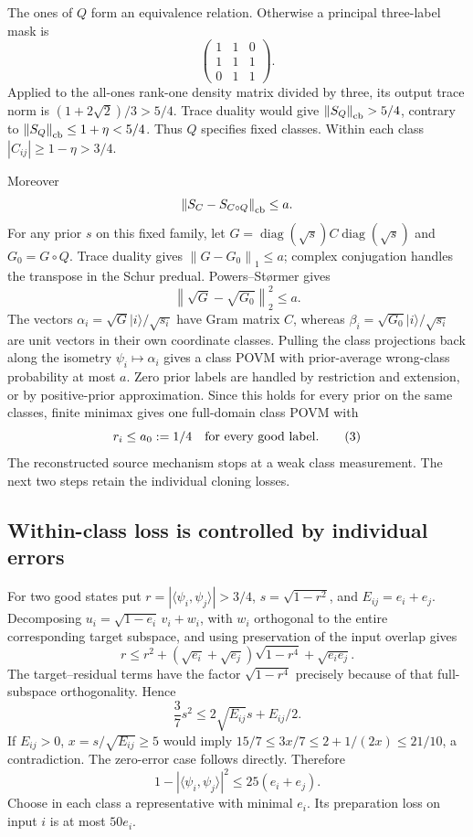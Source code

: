\documentclass[11pt]{article}
\newcommand{\norm}[1]{\left\lVert#1\right\rVert}
\begin{document}
The ones of $Q$ form an equivalence relation. Otherwise a principal three-label mask is
\[
\begin{pmatrix}1&1&0\\1&1&1\\0&1&1\end{pmatrix}.
\]
Applied to the all-ones rank-one density matrix divided by three, its output trace norm is $(1+2\sqrt2)/3>5/4$. Trace duality would give $\norm{S_Q}_{\rm cb}>5/4$, contrary to $\norm{S_Q}_{\rm cb}\le1+\eta<5/4$. Thus $Q$ specifies fixed classes. Within each class $|C_{ij}|\ge1-\eta>3/4$.

Moreover
\[
\norm{S_C-S_{C\circ Q}}_{\rm cb}\le a.
\]
For any prior $s$ on this fixed family, let $G=\operatorname{diag}(\sqrt s)C\operatorname{diag}(\sqrt s)$ and $G_0=G\circ Q$. Trace duality gives $\norm{G-G_0}_1\le a$; complex conjugation handles the transpose in the Schur predual. Powers--St\o rmer gives
\[
\norm{\sqrt G-\sqrt{G_0}}_2^2\le a.
\]
The vectors $\alpha_i=\sqrt G|i\rangle/\sqrt{s_i}$ have Gram matrix $C$, whereas $\beta_i=\sqrt{G_0}|i\rangle/\sqrt{s_i}$ are unit vectors in their own coordinate classes. Pulling the class projections back along the isometry $\psi_i\mapsto\alpha_i$ gives a class POVM with prior-average wrong-class probability at most $a$. Zero prior labels are handled by restriction and extension, or by positive-prior approximation. Since this holds for every prior on the same classes, finite minimax gives one full-domain class POVM with
\[
r_i\le a_0:=1/4\quad\hbox{for every good label.}\tag{3}
\]
The reconstructed source mechanism stops at a weak class measurement. The next two steps retain the individual cloning losses.

\subsection{Within-class loss is controlled by individual errors}

For two good states put $r=|\langle\psi_i,\psi_j\rangle|>3/4$, $s=\sqrt{1-r^2}$, and $E_{ij}=e_i+e_j$. Decomposing $u_i=\sqrt{1-e_i}\,v_i+w_i$, with $w_i$ orthogonal to the entire corresponding target subspace, and using preservation of the input overlap gives
\[
r\le r^2+(\sqrt{e_i}+\sqrt{e_j})\sqrt{1-r^4}+\sqrt{e_i e_j}.
\]
The target--residual terms have the factor $\sqrt{1-r^4}$ precisely because of that full-subspace orthogonality. Hence
\[
\frac37s^2\le2\sqrt{E_{ij}}s+E_{ij}/2.
\]
If $E_{ij}>0$, $x=s/\sqrt{E_{ij}}\ge5$ would imply
$15/7\le3x/7\le2+1/(2x)\le21/10$, a contradiction. The zero-error case follows directly. Therefore
\[
1-|\langle\psi_i,\psi_j\rangle|^2\le25(e_i+e_j).\tag{4}
\]
Choose in each class a representative with minimal $e_i$. Its preparation loss on input $i$ is at most $50e_i$.
\end{document}
